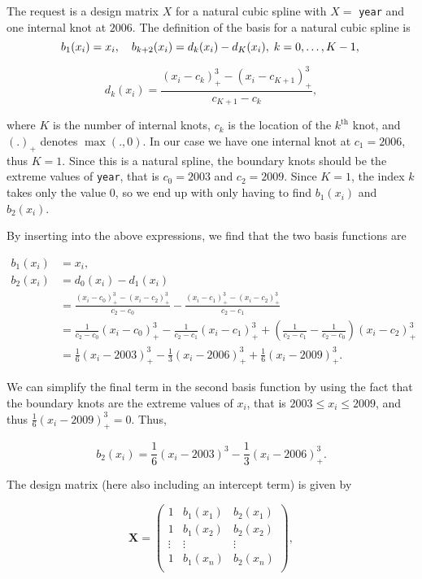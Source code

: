 \documentclass[
]{article}
\begin{document}
The request is a design matrix \(X\) for a natural cubic spline with
\(X =\) \texttt{year} and one internal knot at \(2006\). The definition
of the basis for a natural cubic spline is \[
b_1(x_i) = x_i, \quad b_{k+2}(x_i) = d_k(x_i)-d_K(x_i),\; k = 0, \ldots, K - 1,\\
\]

\[
d_k(x_i) = \frac{(x_i-c_k)^3_+-(x_i-c_{K+1})^3_+}{c_{K+1}-c_k},
\]

where \(K\) is the number of internal knots, \(c_k\) is the location of
the \(k^\text{th}\) knot, and \((.)_+\) denotes \(\max (., 0)\). In our
case we have one internal knot at \(c_1 = 2006\), thus \(K = 1\). Since
this is a natural spline, the boundary knots should be the extreme
values of \texttt{year}, that is \(c_0 = 2003\) and \(c_2 = 2009\).
Since \(K=1\), the index \(k\) takes only the value \(0\), so we end up
with only having to find \(b_1(x_i)\) and \(b_2(x_i)\).

By inserting into the above expressions, we find that the two basis
functions are

\begin{align*}
b_1(x_i) &= x_i,\\
b_2(x_i) &= d_0(x_i)-d_1(x_i)\\
&= \frac{(x_i-c_0)^3_+-(x_i-c_2)^3_+}{c_2-c_0} - \frac{(x_i-c_1)^3_+-(x_i-c_2)^3_+}{c_2-c_1}\\
&= \frac{1}{c_2-c_0}(x_i-c_0)^3_+ - \frac{1}{c_2-c_1}(x_i-c_1)^3_+ + \left(\frac{1}{c_2-c_1}-\frac{1}{c_2-c_0}\right)(x_i-c_{2})^3_+\\
&= \frac{1}{6}(x_i-2003)^3_+ - \frac{1}{3}(x_i-2006)^3_+ + \frac{1}{6}(x_i-2009)^3_+.
\end{align*}

We can simplify the final term in the second basis function by using the
fact that the boundary knots are the extreme values of \(x_i\), that is
\(2003 \leq x_i \leq 2009\), and thus \(\frac{1}{6}(x_i-2009)^3_+=0\).
Thus,

\[
b_2(x_i) = \frac{1}{6}(x_i-2003)^3 - \frac{1}{3}(x_i-2006)^3_+.
\]

The design matrix (here also including an intercept term) is given by

\[
\mathbf X = \begin{pmatrix}
1 & b_{1}(x_1) & b_{2}(x_1) \\
1 & b_{1}(x_2) & b_{2}(x_2) \\
\vdots & \vdots & \vdots \\
1 & b_{1}(x_n) & b_{2}(x_n) \\
\end{pmatrix},
\]
\end{document}
